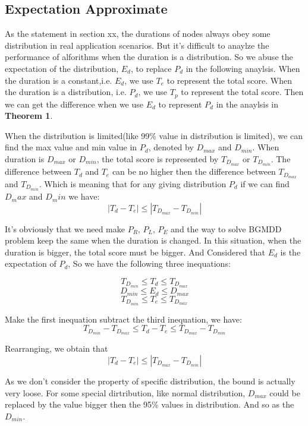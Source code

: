\subsection{Expectation Approximate}
\par As the statement in section xx, the durations of nodes always obey some distribution in real application scenarios. But it's difficult to anaylze the performance of alforithms when the duration is a distribution. So we abuse the expectation of the distribution, $E_d$, to replace $P_d$ in the following anaylsis. When the duration is a constant,i.e. $E_d$, we use $T_e$ to represent the total score. When the duration is a distribution, i.e. $P_d$, we use $T_p$ to represent the total score. Then we can get the difference when we use $E_d$ to represent $P_d$ in the anaylsis in \textbf{Theorem 1}.
\begin{theorem}\label{theorem:TheFatTreeInApx}
When the distribution is limited(like 99\% value in distribution is limited), we can find the max value and min value in $P_d$, denoted by $D_{max}$ and $D_{min}$. When duration is $D_{max}$ or $D_{min}$, the total score is represented by $T_{D_{max}}$ or $T_{D_{min}}$. The difference between $T_d$ and $T_e$ can be no higher then the difference between $T_{D_{max}}$ and $T_{D_{min}}$. Which is meaning that for any giving distribution $P_d$ if we can find $D_max$ and $D_min$ we have:
$$\left| T_d-T_e \right|\leq\left| T_{D_{max}}-T_{D_{min}} \right|$$
\end{theorem}
\begin{IEEEproof}
It's obviously that we need make $P_R$, $P_L$, $P_E$ and the way to solve BGMDD problem keep the same when the duration is changed. In this situation, when the duration is bigger, the total score must be bigger. And Considered that $E_d$ is the expectation of  $P_d$, So we have the following three inequations:
{\setlength\abovedisplayskip{1pt}
\setlength\belowdisplayskip{1pt}
\begin{spacing}{1.0}
$$ T_{D_{min}}\leq T_d \leq T_{D_{max}} $$
$$D_{min}\leq E_d \leq D_{max}$$
$$ T_{D_{min}}\leq T_e \leq T_{D_{max}} $$
\par Make the first inequation subtract the third inequation, we have:
$$ T_{D_{min}}-T_{D_{max}}\leq T_d-T_e \leq T_{D_{max}}-T_{D_{min}} $$
\par Rearranging, we obtain that
$$\left| T_d-T_e \right|\leq\left| T_{D_{max}}-T_{D_{min}} \right|$$
\end{spacing}}
\end{IEEEproof}
\par As we don't consider the property of specific distribution, the bound is actually very loose. For some special dirtribution, like normal distribution, $D_{max}$ could be replaced by the value bigger then the 95\% values in distribution. And so as the $D_{min}$.
